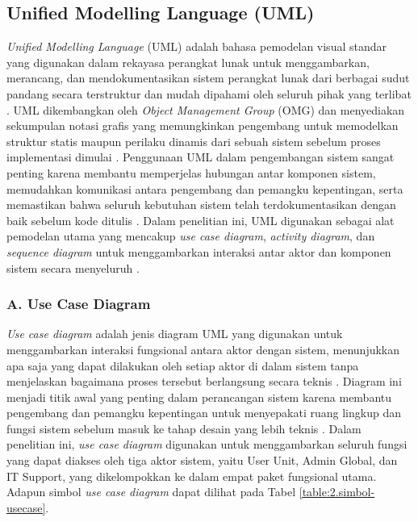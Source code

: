 \subsection{Unified Modelling Language (UML)} \label{II.UML}
\textit{Unified Modelling Language} (UML) adalah bahasa pemodelan visual standar yang digunakan dalam rekayasa perangkat lunak untuk menggambarkan, merancang, dan mendokumentasikan sistem perangkat lunak dari berbagai sudut pandang secara terstruktur dan mudah dipahami oleh seluruh pihak yang terlibat \cite{nistrina2022uml}. UML dikembangkan oleh \textit{Object Management Group} (OMG) dan menyediakan sekumpulan notasi grafis yang memungkinkan pengembang untuk memodelkan struktur statis maupun perilaku dinamis dari sebuah sistem sebelum proses implementasi dimulai \cite{nistrina2022uml}. Penggunaan UML dalam pengembangan sistem sangat penting karena membantu memperjelas hubungan antar komponen sistem, memudahkan komunikasi antara pengembang dan pemangku kepentingan, serta memastikan bahwa seluruh kebutuhan sistem telah terdokumentasikan dengan baik sebelum kode ditulis \cite{nugraha2025uml}. Dalam penelitian ini, UML digunakan sebagai alat pemodelan utama yang mencakup \textit{use case diagram}, \textit{activity diagram}, dan \textit{sequence diagram} untuk menggambarkan interaksi antar aktor dan komponen sistem secara menyeluruh \cite{nugraha2025uml}. \par

\subsubsection*{A. Use Case Diagram} \label{II.UseCase}
\textit{Use case diagram} adalah jenis diagram UML yang digunakan untuk menggambarkan interaksi fungsional antara aktor dengan sistem, menunjukkan apa saja yang dapat dilakukan oleh setiap aktor di dalam sistem tanpa menjelaskan bagaimana proses tersebut berlangsung secara teknis \cite{nugraha2025uml}. Diagram ini menjadi titik awal yang penting dalam perancangan sistem karena membantu pengembang dan pemangku kepentingan untuk menyepakati ruang lingkup dan fungsi sistem sebelum masuk ke tahap desain yang lebih teknis \cite{nugraha2025uml}. Dalam penelitian ini, \textit{use case diagram} digunakan untuk menggambarkan seluruh fungsi yang dapat diakses oleh tiga aktor sistem, yaitu User Unit, Admin Global, dan IT Support, yang dikelompokkan ke dalam empat paket fungsional utama. Adapun simbol \textit{use case diagram} dapat dilihat pada Tabel \ref{table:2.simbol-usecase}. \par

